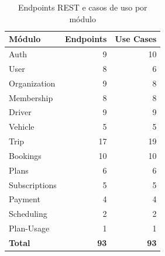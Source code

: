 \begin{table}[H]
\centering
\caption{Endpoints REST e casos de uso por módulo}
\label{tab:endpoints}
\begin{tabular}{lrr}
\toprule
\textbf{Módulo} & \textbf{Endpoints} & \textbf{Use Cases} \\
\midrule
Auth & 9 & 10 \\
User & 8 & 6 \\
Organization & 9 & 8 \\
Membership & 8 & 8 \\
Driver & 9 & 9 \\
Vehicle & 5 & 5 \\
Trip & 17 & 19 \\
Bookings & 10 & 10 \\
Plans & 6 & 6 \\
Subscriptions & 5 & 5 \\
Payment & 4 & 4 \\
Scheduling & 2 & 2 \\
Plan-Usage & 1 & 1 \\
\midrule
\textbf{Total} & \textbf{93} & \textbf{93} \\
\bottomrule
\end{tabular}
\end{table}
